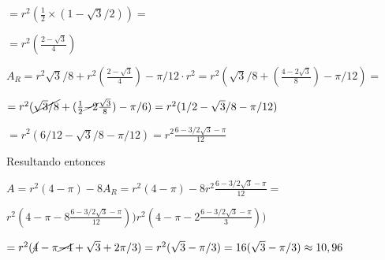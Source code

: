 \documentclass[a4paper]{article}
\begin{document}
$=r^2( \frac{1}{2}\times (1-\sqrt{3}/2))=$

$=r^2(\frac{2-\sqrt{3}}{4}) $

$A_R=r^2\sqrt{3}/8+ r^2 (\frac{2-\sqrt{3}}{4})-\pi/12 \cdot r^2=r^2(\sqrt{3}/8+ (\frac{4-2\sqrt{3}}{8})-\pi/12)=$ 

$=r^2(\cancel{\sqrt{3}/8}+ (\frac{1}{2}\cancel{-2}\frac{\sqrt{3}}{8})-\pi/6)=r^2 (1/2-\sqrt{3}/8-\pi/12)$

$=r^2 (6/12-\sqrt{3}/8-\pi/12)=r^2 \frac{6-3/2\sqrt{3}-\pi}{12}$

Resultando entonces 

$A=r^2(4-\pi)-8 A_R=r^2(4-\pi)-8r^2 \frac{6-3/2\sqrt{3}-\pi}{12}=$

$r^2(4-\pi-8\frac{6-3/2\sqrt{3}-\pi}{12}))r^2(4-\pi-2\frac{6-3/2\sqrt{3}-\pi}{3}))$

$=r^2(\cancel{4}-\pi \cancel{-4}+\sqrt{3}+2\pi/3)=r^2 (\sqrt{3}-\pi/3)=16 (\sqrt{3}-\pi/3)\approx 10,96$



\end{document}
